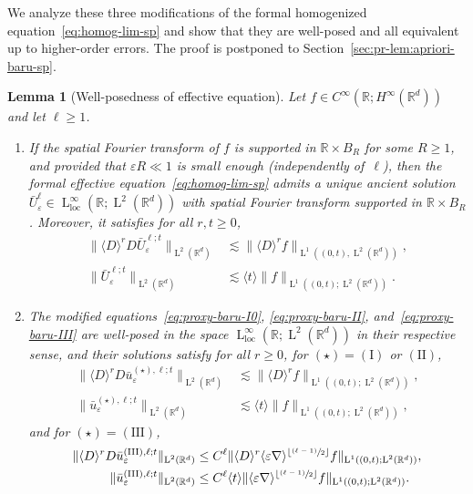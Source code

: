 \documentclass[JEP,XML,SOM,Unicode,published]{cedram}
\newenvironment{enumeratei}
{\bgroup\def\theenumi{\roman{enumi}}\def\theenumii{\arabic{enumii}}\begin{enumerate}}
{\end{enumerate}\egroup}
\newcommand{\psfrac}[2]{\sfrac{(#1)}{#2}}
\theoremstyle{plain}
\newtheorem{lem0}[theor0]{Lemma}
\newenvironment{lem}
{\renewcommand{\qedsymbol}{$\lozenge$}\pushQED{\qed}\begin{lem0}}
{\popQED\end{lem0}}
\theoremstyle{definition}
\numberwithin{equation}{section}
\newcommand{\e}{\varepsilon}
\newcommand{\R}{\mathbb R}
\newcommand{\loc}{{\operatorname{loc}}}
\newcommand{\Ld}{\operatorname{L}}
\begin{document}
We analyze these three modifications of the formal homogenized equation~\eqref{eq:homog-lim-sp} and show that they are well-posed and all equivalent up to higher-order errors.
The proof is postponed to Section~\ref{sec:pr-lem:apriori-baru-sp}.

\begin{lem}[Well-posedness of effective equation]\label{lem:apriori-baru-sp}
Let $f\in C^\infty(\R;H^\infty(\R^d))$ and let $\ell\ge1$.
\begin{enumeratei}
\item\label{lem:apriori-baru-spi} If the spatial Fourier transform of $f$ is supported in $\R\times B_R$ for some $R\ge1$, and provided that $\e R\ll1$ is small enough (independently of~$\ell$), then the formal effective equation~\eqref{eq:homog-lim-sp} admits a unique ancient solution $\bar U_\e^\ell\in\Ld^\infty_\loc(\R;\Ld^2(\R^d))$ with spatial Fourier transform supported in $\R\times B_R$.
Moreover, it satisfies for all $r,t\ge0$,
\begin{align*}
\|\langle D\rangle^rD\bar U_\e^{\ell;t}\|_{\Ld^2(\R^d)}&\lesssim\|\langle D\rangle^rf\|_{\Ld^1((0,t),\Ld^2(\R^d))},\\
\|\bar U_\e^{\ell;t}\|_{\Ld^2(\R^d)}&\lesssim\langle t\rangle\|f\|_{\Ld^1((0,t);\Ld^2(\R^d))}.
\end{align*}
\item\label{lem:apriori-baru-spii} The modified equations~\eqref{eq:proxy-baru-I0}, \eqref{eq:proxy-baru-II}, and~\eqref{eq:proxy-baru-III} are well-posed in the space $\Ld^\infty_\loc(\R;\Ld^2(\R^d))$ in their respective sense, and their solutions satisfy for all $r\ge0$, for $(\star)=\operatorname{(I)}$ or $\operatorname{(II)}$,
\begin{align*}
\|\langle D\rangle^rD\bar u_\e^{{(\star)},\ell;t}\|_{\Ld^2(\R^d)}&\lesssim\|\langle D\rangle^rf\|_{\Ld^1((0,t);\Ld^2(\R^d))},
\\
\|\bar u_\e^{(\star),\ell;t}\|_{\Ld^2(\R^d)}&\lesssim\langle t\rangle\|f\|_{\Ld^1((0,t);\Ld^2(\R^d))},
\end{align*}
and for $(\star)=\operatorname{(III)}$,
\begin{align*}
\|\langle D\rangle^rD\bar u_\e^{\operatorname{(III)},\ell;t}\|_{\Ld^2(\R^d)}&\le C^{\ell}\|\langle D\rangle^r\langle\e\nabla\rangle^{\lfloor\psfrac{\ell-1}2\rfloor}f\|_{\Ld^1((0,t);\Ld^2(\R^d))},\\
\|\bar u_\e^{\operatorname{(III)},\ell;t}\|_{\Ld^2(\R^d)}&\le C^{\ell}\langle t\rangle\|\langle \e\nabla\rangle^{\lfloor\psfrac{\ell-1}2\rfloor}f\|_{\Ld^1((0,t);\Ld^2(\R^d))}.
\end{align*}


\end{enumeratei}
\end{lem}
\end{document}
